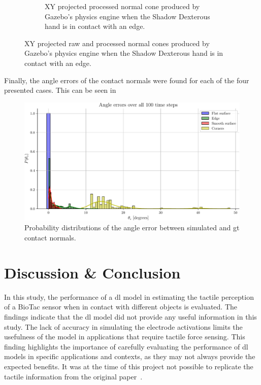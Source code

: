 \begin{figure}[!h]
\begin{subfigure}[b]{0.48\textwidth}
		\caption{XY projected processed normal cone produced by Gazebo's physics engine when the Shadow Dexterous hand is in contact with an edge.}
		\label{fig:xy-projected-processed-normal-cones}
	\end{subfigure}
		\caption{XY projected raw and processed normal cones produced by Gazebo's physics engine when the Shadow Dexterous hand is in contact with an edge.}
		\label{fig:xy-projected-processed-normal-normal-cones}
\end{figure}

Finally, the angle errors  of the contact normals were found for each of the four presented cases. This can be seen in~

\begin{figure}[!h]
	\begin{center}
		\includegraphics[width=\textwidth]{chapters/1-tactile-perception/fig/matplotlib/histogram-normal-errors.pdf}
	\end{center}
	\caption{Probability distributions of the angle error  between simulated and \gls{gt} contact normals.}
	\label{fig:histogram-normal-errors}
\end{figure}

\newpage
\section{Discussion \& Conclusion}\label{sec:1-tactile-perception-discussion-and-conclusion}

In this study, the performance of a \gls{dl} model in estimating the tactile perception of a BioTac sensor when in contact with different objects is evaluated. The findings indicate that the \gls{dl} model did not provide any useful information in this study. The lack of accuracy in simulating the electrode activations limits the usefulness of the model in applications that require tactile force sensing. This finding highlights the importance of carefully evaluating the performance of \gls{dl} models in specific applications and contexts, as they may not always provide the expected benefits. It was at the time of this project not possible to replicate the tactile information from the original paper~\cite{simulation-of-the-syntouch-biotac-sensor}. \medskip

